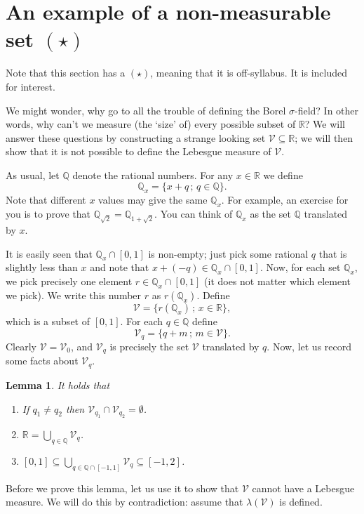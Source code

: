 \documentclass[a4paper]{report}
\newcounter{thm_counter}[chapter]
\newtheorem{lemma}[thm_counter]{Lemma}
\numberwithin{equation}{chapter}
\numberwithin{thm_counter}{section}
\def\sw{\subseteq} %
\def\mb{\mathbb} %
\def\R{\mb{R}} %
\def\Q{\mb{Q}}
\def\-{\,;\,} %
\begin{document}
\newpage
\section{An example of a non-measurable set \((\star)\)}
\label{sec:non_meas_set}

Note that this section has a $(\star)$, meaning that it is off-syllabus. 
It is included for interest.

We might wonder, why go to all the trouble of defining the Borel $\sigma$-field? 
In other words, why can't we measure (the `size' of) every possible subset of $\R$? 
We will answer these questions by constructing a strange looking set $\mathscr{V}\sw\R$; 
we will then show that it is not possible to define the Lebesgue measure of $\mathscr{V}$.

As usual, let $\Q$ denote the rational numbers.
For any $x\in\R$ we define
\begin{equation}
\label{eq:Qx_def}
\Q_x=\{x+q\-q\in\Q\}.
\end{equation}
Note that different $x$ values may give the same $\Q_x$. For example, an exercise for you is to prove that $\Q_{\sqrt{2}}=\Q_{1+\sqrt{2}}$. You can think of $\Q_x$ as the set $\Q$ translated by $x$.

It is easily seen that $\Q_x\cap[0,1]$ is non-empty; just pick some rational $q$ that is slightly less than $x$ and note that
$x+(-q)\in\Q_x\cap[0,1]$. Now, for each set $\Q_x$, we pick precisely one element $r\in\Q_x\cap[0,1]$ (it does not matter which element we pick).
We write this number $r$ as $r(\Q_x)$.
Define
$$\mathscr{V}=\{r(\Q_x)\-x\in\mathbb{R}\},$$
which is a subset of $[0,1]$.
For each $q\in\Q$ define
$$\mathscr{V}_q=\{q+m\-m\in\mathscr{V}\}.$$
Clearly $\mathscr{V}=\mathscr{V}_0$, and $\mathscr{V}_q$ is precisely the set $\mathscr{V}$ translated by $q$.
Now, let us record some facts about $\mathscr{V}_q$.

\begin{lemma}
\label{lem:non_meas_pre}
It holds that
\begin{enumerate}
\item If $q_1\neq q_2$ then $\mathscr{V}_{q_1}\cap \mathscr{V}_{q_2}=\emptyset$.
\item $\R=\bigcup_{q\in\Q} \mathscr{V}_q$.
\item $[0,1]\sw \bigcup_{q\in\Q\cap[-1,1]} \mathscr{V}_q\sw[-1,2]$.
\end{enumerate}
\end{lemma}
Before we prove this lemma, let us use it to show that $\mathscr{V}$ cannot have a Lebesgue measure.
We will do this by contradiction: assume that $\lambda(\mathscr{V})$ is defined.
\end{document}
